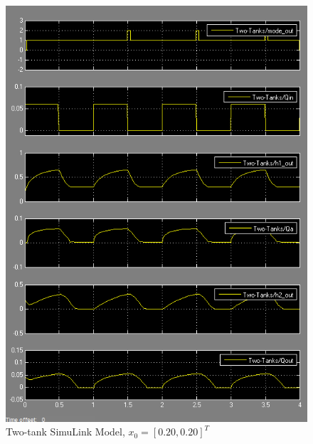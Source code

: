 \documentclass[letterpaper]{article}
\begin{document}
\begin{figure}[h!]
\centering
\includegraphics[scale=0.7]{hw8_20_20.png}
\caption{Two-tank SimuLink Model, $x_0 = [0.20, 0.20]^T$ }
\label{fig:two-tank-model-20-20}
\end{figure}
\end{document}
